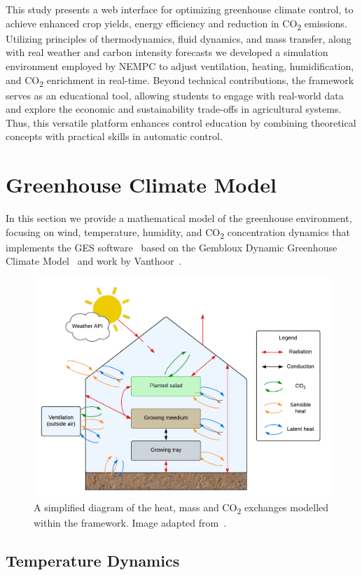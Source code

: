 \documentclass[conference]{IEEEtran}
\begin{document}
This study presents a web interface for optimizing greenhouse climate control, to achieve enhanced crop yields, energy efficiency and reduction in CO\textsubscript{2} emissions. Utilizing principles of thermodynamics, fluid dynamics, and mass transfer, along with real weather and carbon intensity forecasts we developed a simulation environment employed by NEMPC to adjust ventilation, heating, humidification, and CO\textsubscript{2} enrichment in real-time. Beyond technical contributions, the framework serves as an educational tool, allowing students to engage with real-world data and explore the economic and sustainability trade-offs in agricultural systems. Thus, this versatile platform enhances control education by combining theoretical concepts with practical skills in automatic control.

\section{Greenhouse Climate Model}\label{sec:greenhouse}
In this section we provide a mathematical model of the greenhouse environment, focusing on wind, temperature, humidity, and CO\textsubscript{2} concentration dynamics that implements the GES software~\cite{rmward61_2019} based on the Gembloux Dynamic Greenhouse Climate Model~\cite{GDGCM} and work by Vanthoor~\cite{Vanthoor2011}.

\begin{figure}
    \centering
    \includegraphics[width=.5\textwidth]{images/diagram.pdf}
    \caption{A simplified diagram of the heat, mass and CO\textsubscript{2} exchanges modelled within the framework. Image adapted from~\cite{rmward61_2019}.}\label{fig:diagram}
\end{figure}

\subsection{Temperature Dynamics}\label{subsec:temperature}
\end{document}
